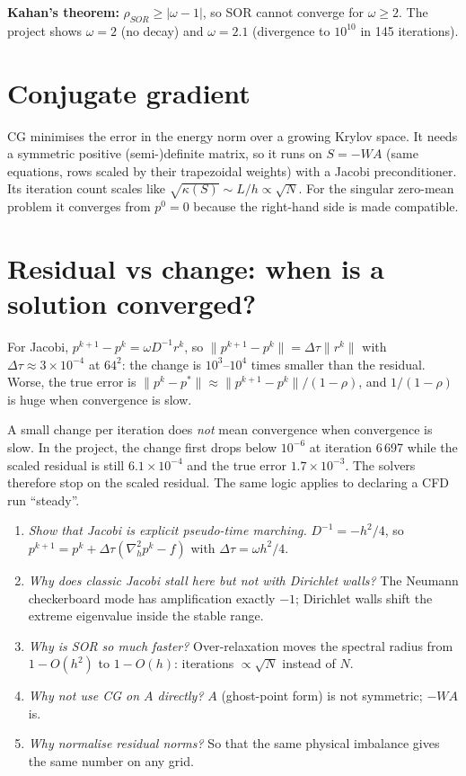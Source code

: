 \textbf{Kahan's theorem:} $\rho_{SOR}\ge|\omega-1|$, so SOR cannot converge for $\omega\ge2$. The project shows $\omega=2$ (no decay) and $\omega=2.1$ (divergence to $10^{10}$ in 145 iterations).

\section{Conjugate gradient}
CG minimises the error in the energy norm over a growing Krylov space. It needs a symmetric positive (semi-)definite matrix, so it runs on $S=-WA$ (same equations, rows scaled by their trapezoidal weights) with a Jacobi preconditioner. Its iteration count scales like $\sqrt{\kappa(S)}\sim L/h\propto\sqrt N$. For the singular zero-mean problem it converges from $p^0=0$ because the right-hand side is made compatible.

\section{Residual vs change: when is a solution converged?}
For Jacobi, $p^{k+1}-p^k=\omega D^{-1}r^k$, so $\|p^{k+1}-p^k\|=\Delta\tau\|r^k\|$ with $\Delta\tau\approx3\times10^{-4}$ at $64^2$: the change is $10^3$--$10^4$ times smaller than the residual. Worse, the true error is $\|p^k-p^*\|\approx\|p^{k+1}-p^k\|/(1-\rho)$, and $1/(1-\rho)$ is huge when convergence is slow.

\begin{keyidea}
A small change per iteration does \emph{not} mean convergence when convergence is slow. In the project, the change first drops below $10^{-6}$ at iteration 6\,697 while the scaled residual is still $6.1\times10^{-4}$ and the true error $1.7\times10^{-3}$. The solvers therefore stop on the scaled residual. The same logic applies to declaring a CFD run ``steady''.
\end{keyidea}

\begin{viva}
\begin{enumerate}[leftmargin=*]
\item \emph{Show that Jacobi is explicit pseudo-time marching.} $D^{-1}=-h^2/4$, so $p^{k+1}=p^k+\Delta\tau(\nabla^2_hp^k-f)$ with $\Delta\tau=\omega h^2/4$.
\item \emph{Why does classic Jacobi stall here but not with Dirichlet walls?} The Neumann checkerboard mode has amplification exactly $-1$; Dirichlet walls shift the extreme eigenvalue inside the stable range.
\item \emph{Why is SOR so much faster?} Over-relaxation moves the spectral radius from $1-O(h^2)$ to $1-O(h)$: iterations $\propto\sqrt N$ instead of $N$.
\item \emph{Why not use CG on $A$ directly?} $A$ (ghost-point form) is not symmetric; $-WA$ is.
\item \emph{Why normalise residual norms?} So that the same physical imbalance gives the same number on any grid.
\end{enumerate}
\end{viva}
